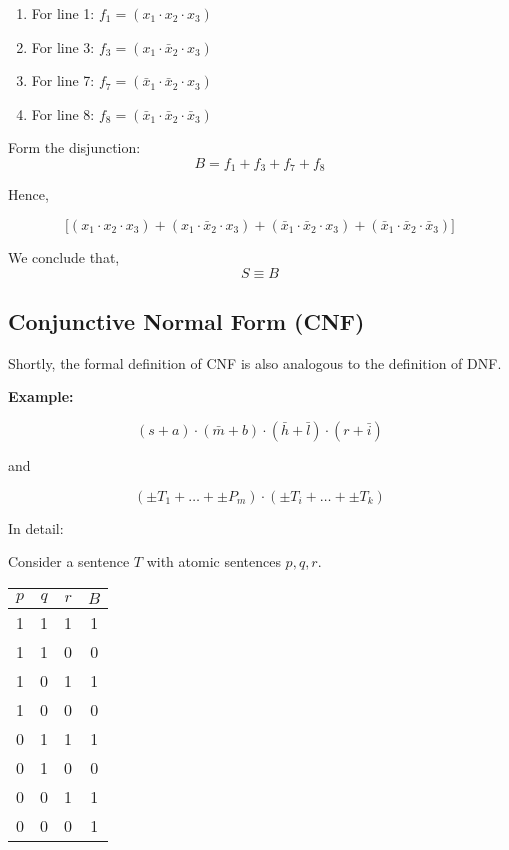 \documentclass[12pt,a4paper,openany]{article}
\begin{document}
\begin{enumerate}
\item For line 1: $f_1 = (x_1 \cdot x_2 \cdot x_3)$
\item For line 3: $f_3 = (x_1 \cdot \bar x_2 \cdot x_3)$
\item For line 7: $f_7 = (\bar x_1 \cdot \bar x_2 \cdot x_3)$
\item For line 8: $f_8 = (\bar x_1 \cdot \bar x_2 \cdot \bar x_3)$
\end{enumerate}

Form the disjunction: 
$$B = f_1 + f_3 + f_7 + f_8$$

Hence,

$$\big[(x_1 \cdot x_2 \cdot x_3) + (x_1 \cdot \bar x_2 \cdot x_3) + (\bar x_1 \cdot \bar x_2 \cdot x_3) + (\bar x_1 \cdot \bar x_2 \cdot \bar x_3)\big]$$

We conclude that, 
$$S \equiv B$$

\subsection{Conjunctive Normal Form (CNF)}

Shortly, the formal definition of CNF is also analogous to the
definition of DNF.

\textbf{Example:}

$$(s + a) \cdot (\bar m + b) \cdot (\bar h + \bar l) \cdot (r + \bar i)$$

and

$$(\pm T_1 + \dots + \pm P_m) \cdot (\pm T_i + \dots + \pm T_k)$$

In detail:

Consider a sentence $T$ with atomic sentences $p, q, r$.

\begin{center}
\begin{tabular}{|c|c|c|c|}
\hline
$p$ & $q$ & $r$ & $B$ \\
\hline
1 & 1 & 1 & 1 \\
\hline
1 & 1 & 0 & 0 \\
\hline
1 & 0 & 1 & 1 \\
\hline
1 & 0 & 0 & 0 \\
\hline
0 & 1 & 1 & 1 \\
\hline
0 & 1 & 0 & 0 \\
\hline
0 & 0 & 1 & 1 \\
\hline
0 & 0 & 0 & 1 \\
\hline
\end{tabular}
\end{center}
\end{document}
